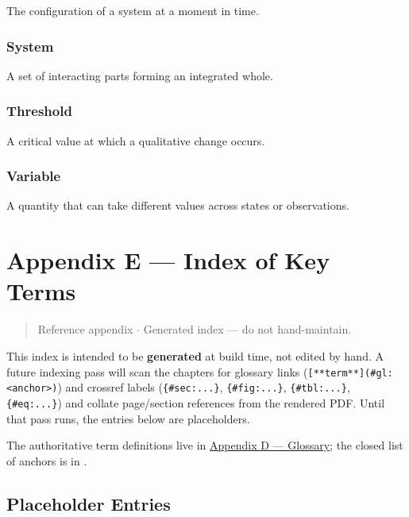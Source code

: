\documentclass[
]{article}
\theoremstyle{plain}
\theoremstyle{definition}
\begin{document}
The configuration of a system at a moment in time.

\subsubsection{System}\label{gl:system}

A set of interacting parts forming an integrated whole.

\subsubsection{Threshold}\label{gl:threshold}

A critical value at which a qualitative change occurs.

\subsubsection{Variable}\label{gl:variable}

A quantity that can take different values across states or observations.

\newpage

\section{Appendix E --- Index of Key Terms}\label{sec:appendix_index}

\begin{quote}
Reference appendix \texorpdfstring{\ensuremath{\cdot}}{.} Generated index --- do not hand-maintain.
\end{quote}

This index is intended to be \textbf{generated} at build time, not
edited by hand. A future indexing pass will scan the chapters for
glossary links
(\texttt{{[}**term**{]}(\#gl:\textless{}anchor\textgreater{})}) and
crossref labels (\texttt{\{\#sec:...\}}, \texttt{\{\#fig:...\}},
\texttt{\{\#tbl:...\}}, \texttt{\{\#eq:...\}}) and collate page/section
references from the rendered PDF. Until that pass runs, the entries
below are placeholders.

The authoritative term definitions live in
\href{../glossary.md}{Appendix D --- Glossary}; the closed list of
anchors is  in
\href{../../src/textbook/constants.py}{}.

\subsection{Placeholder Entries}\label{placeholder-entries}
\end{document}
